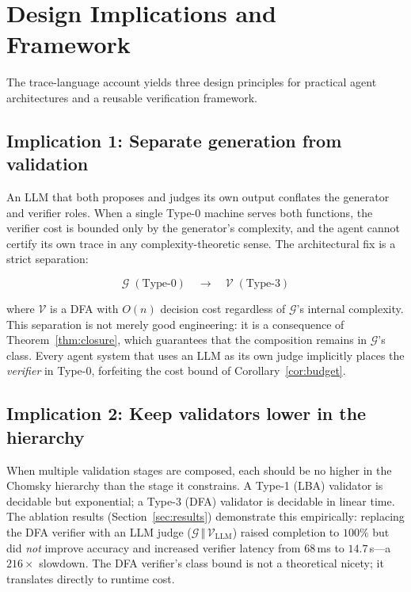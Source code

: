 \section{Design Implications and Framework}
\label{sec:implications}

The trace-language account yields three design principles for
practical agent architectures and a reusable verification framework.

\subsection{Implication 1: Separate generation from validation}

An LLM that both proposes and judges its own output conflates the
generator and verifier roles.  When a single Type-0 machine serves
both functions, the verifier cost is bounded only by the generator's
complexity, and the agent cannot certify its own trace in any
complexity-theoretic sense.  The architectural fix is a strict
separation:

\[
\mathcal{G}\;(\text{Type-0}) \quad\longrightarrow\quad
\mathcal{V}\;(\text{Type-3})
\]

where $\mathcal{V}$ is a DFA with $O(n)$ decision cost regardless of
$\mathcal{G}$'s internal complexity.  This separation is not merely
good engineering: it is a consequence of
Theorem~\ref{thm:closure}, which guarantees that the composition
remains in $\mathcal{G}$'s class.  Every agent system that uses an
LLM as its own judge implicitly places the \emph{verifier} in
Type-0, forfeiting the cost bound of
Corollary~\ref{cor:budget}.

\subsection{Implication 2: Keep validators lower in the hierarchy}

When multiple validation stages are composed, each should be no
higher in the Chomsky hierarchy than the stage it constrains.  A
Type-1 (LBA) validator is decidable but exponential; a Type-3 (DFA)
validator is decidable in linear time.  The ablation results
(Section~\ref{sec:results}) demonstrate this empirically: replacing
the DFA verifier with an LLM judge ($\mathcal{G}\,\Vert\,\mathcal{V}_{\mathrm{LLM}}$)
raised completion to $100\%$ but did \emph{not} improve accuracy
and increased verifier latency from $68$\,ms to $14.7$\,s---a
$216\times$ slowdown.  The DFA verifier's class bound is not a
theoretical nicety; it translates directly to runtime cost.

